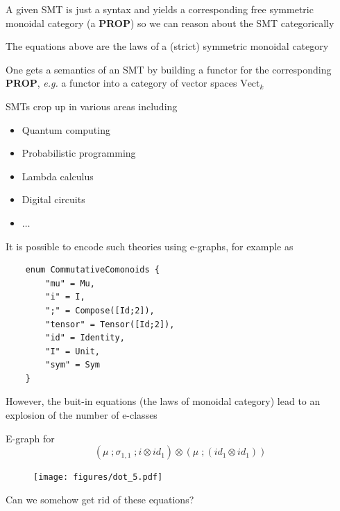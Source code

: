 \documentclass[aspectratio=169]{beamer}
\begin{document}
\begin{frame}
    \vfill
    A given SMT is just a syntax and yields a corresponding free symmetric monoidal category (a \textbf{PROP}) so we can reason about the SMT categorically

    \vfill

    The equations above are the laws of a (strict) symmetric monoidal category
    \vfill

    One gets a semantics of an SMT by building a functor for the corresponding \textbf{PROP}, \textit{e.g.} a functor into a category of vector spaces \textbf{$\text{Vect}_{k}$}
\end{frame}

\begin{frame}
    SMTs crop up in various areas including
    \begin{itemize}
        \item Quantum computing
        \item Probabilistic programming
        \item Lambda calculus
        \item Digital circuits
        \item $\ldots$
    \end{itemize}
\end{frame}

\begin{frame}[containsverbatim]{}

It is possible to encode such theories using e-graphs, for example as

\begin{verbatim}
    enum CommutativeComonoids {
        "mu" = Mu,
        "i" = I,
        ";" = Compose([Id;2]),
        "tensor" = Tensor([Id;2]),
        "id" = Identity,
        "I" = Unit,
        "sym" = Sym    
    }
\end{verbatim}



\end{frame}

\begin{frame}
    However, the buit-in equations (the laws of monoidal category) lead to an explosion of the number of e-classes

    \begin{example}
        \vspace{1em}
        E-graph for
        \[
            (\mu\;;\sigma_{1,1}\;;i \otimes id_{1}) \otimes (\mu\;;(id_{1}\otimes id_{1}))
        \]
            
        \begin{figure}
            \texttt{[image: figures/dot\_5.pdf]}
        \end{figure}
        
        \end{example}
        
        \pause
        
        Can we somehow get rid of these equations?
\end{frame}
\end{document}
